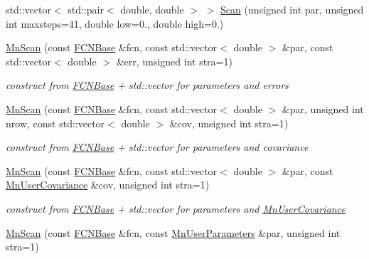 \begin{DoxyCompactItemize}
\item 
std\+::vector$<$ std\+::pair$<$ double, double $>$ $>$ \mbox{\hyperlink{classROOT_1_1Minuit2_1_1MnScan_ae488bb0cc7b7127847fdccdadced3ced}{Scan}} (unsigned int par, unsigned int maxsteps=41, double low=0., double high=0.)
\item 
\mbox{\hyperlink{classROOT_1_1Minuit2_1_1MnScan_a377822c78ab78d995bc0a710dbc0c426}{Mn\+Scan}} (const \mbox{\hyperlink{classROOT_1_1Minuit2_1_1FCNBase}{F\+C\+N\+Base}} \&fcn, const std\+::vector$<$ double $>$ \&par, const std\+::vector$<$ double $>$ \&err, unsigned int stra=1)
\begin{DoxyCompactList}\small\item\em construct from \mbox{\hyperlink{classROOT_1_1Minuit2_1_1FCNBase}{F\+C\+N\+Base}} + std\+::vector for parameters and errors \end{DoxyCompactList}\item 
\mbox{\hyperlink{classROOT_1_1Minuit2_1_1MnScan_a293bc22ed5bd5755f4c1d7256c1936ab}{Mn\+Scan}} (const \mbox{\hyperlink{classROOT_1_1Minuit2_1_1FCNBase}{F\+C\+N\+Base}} \&fcn, const std\+::vector$<$ double $>$ \&par, unsigned int nrow, const std\+::vector$<$ double $>$ \&cov, unsigned int stra=1)
\begin{DoxyCompactList}\small\item\em construct from \mbox{\hyperlink{classROOT_1_1Minuit2_1_1FCNBase}{F\+C\+N\+Base}} + std\+::vector for parameters and covariance \end{DoxyCompactList}\item 
\mbox{\hyperlink{classROOT_1_1Minuit2_1_1MnScan_a289c4259abdbd4886dddf51d30531870}{Mn\+Scan}} (const \mbox{\hyperlink{classROOT_1_1Minuit2_1_1FCNBase}{F\+C\+N\+Base}} \&fcn, const std\+::vector$<$ double $>$ \&par, const \mbox{\hyperlink{classROOT_1_1Minuit2_1_1MnUserCovariance}{Mn\+User\+Covariance}} \&cov, unsigned int stra=1)
\begin{DoxyCompactList}\small\item\em construct from \mbox{\hyperlink{classROOT_1_1Minuit2_1_1FCNBase}{F\+C\+N\+Base}} + std\+::vector for parameters and \mbox{\hyperlink{classROOT_1_1Minuit2_1_1MnUserCovariance}{Mn\+User\+Covariance}} \end{DoxyCompactList}\item 
\mbox{\hyperlink{classROOT_1_1Minuit2_1_1MnScan_a93a7093c7881feddd2f7e4541eb8fad9}{Mn\+Scan}} (const \mbox{\hyperlink{classROOT_1_1Minuit2_1_1FCNBase}{F\+C\+N\+Base}} \&fcn, const \mbox{\hyperlink{classROOT_1_1Minuit2_1_1MnUserParameters}{Mn\+User\+Parameters}} \&par, unsigned int stra=1)

\end{DoxyCompactItemize}

